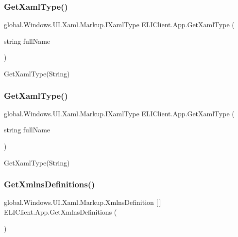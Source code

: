 \subsubsection{\texorpdfstring{Get\+Xaml\+Type()}{GetXamlType()}\hspace{0.1cm}{\footnotesize\ttfamily [5/6]}}
{\footnotesize\ttfamily global.\+Windows.\+U\+I.\+Xaml.\+Markup.\+I\+Xaml\+Type E\+L\+I\+Client.\+App.\+Get\+Xaml\+Type (\begin{DoxyParamCaption}\item[{string}]{full\+Name }\end{DoxyParamCaption})\hspace{0.3cm}{\ttfamily [inline]}}



Get\+Xaml\+Type(\+String) 

\mbox{\label{class_e_l_i_client_1_1_app_a1fdea461073d54f8aa576ffd35b2357e}} 
\subsubsection{\texorpdfstring{Get\+Xaml\+Type()}{GetXamlType()}\hspace{0.1cm}{\footnotesize\ttfamily [6/6]}}
{\footnotesize\ttfamily global.\+Windows.\+U\+I.\+Xaml.\+Markup.\+I\+Xaml\+Type E\+L\+I\+Client.\+App.\+Get\+Xaml\+Type (\begin{DoxyParamCaption}\item[{string}]{full\+Name }\end{DoxyParamCaption})\hspace{0.3cm}{\ttfamily [inline]}}



Get\+Xaml\+Type(\+String) 

\mbox{\label{class_e_l_i_client_1_1_app_accf5e867fe29dd256be7c41a569315c6}} 
\subsubsection{\texorpdfstring{Get\+Xmlns\+Definitions()}{GetXmlnsDefinitions()}\hspace{0.1cm}{\footnotesize\ttfamily [1/3]}}
{\footnotesize\ttfamily global.\+Windows.\+U\+I.\+Xaml.\+Markup.\+Xmlns\+Definition \mbox{[}$\,$\mbox{]} E\+L\+I\+Client.\+App.\+Get\+Xmlns\+Definitions (\begin{DoxyParamCaption}{ }\end{DoxyParamCaption})\hspace{0.3cm}{\ttfamily [inline]}}




